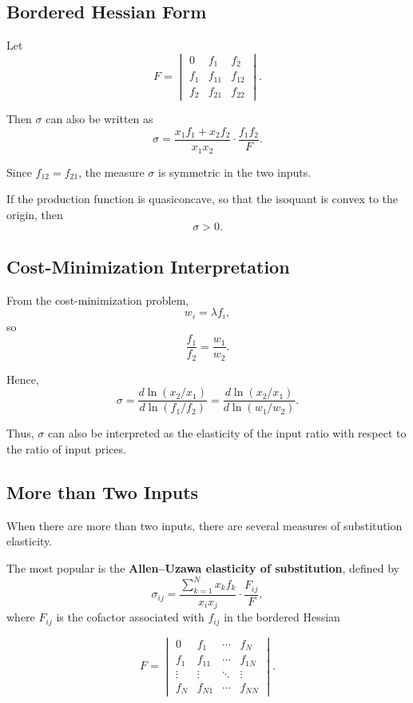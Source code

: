 \subsection*{Bordered Hessian Form}

Let
\[
F =
\begin{vmatrix}
0 & f_1 & f_2 \\
f_1 & f_{11} & f_{12} \\
f_2 & f_{21} & f_{22}
\end{vmatrix}.
\]

Then $\sigma$ can also be written as
\[
\sigma
=
\frac{x_1 f_1 + x_2 f_2}{x_1 x_2}\cdot \frac{f_1 f_2}{F}.
\]

Since $f_{12}=f_{21}$, the measure $\sigma$ is symmetric in the two inputs.

If the production function is quasiconcave, so that the isoquant is convex
to the origin, then
\[
\sigma > 0.
\]

\subsection*{Cost-Minimization Interpretation}

From the cost-minimization problem,
\[
w_i = \lambda f_i,
\]
so
\[
\frac{f_1}{f_2} = \frac{w_1}{w_2}.
\]

Hence,
\[
\sigma
=
\frac{d\ln(x_2/x_1)}{d\ln(f_1/f_2)}
=
\frac{d\ln(x_2/x_1)}{d\ln(w_1/w_2)}.
\]

Thus, $\sigma$ can also be interpreted as the elasticity of the input ratio
with respect to the ratio of input prices.

\subsection*{More than Two Inputs}

When there are more than two inputs, there are several measures of
substitution elasticity.

The most popular is the \textbf{Allen--Uzawa elasticity of substitution},
defined by
\[
\sigma_{ij}
=
\frac{\sum_{k=1}^N x_k f_k}{x_i x_j}\cdot \frac{F_{ij}}{F},
\]
where $F_{ij}$ is the cofactor associated with $f_{ij}$ in the bordered Hessian

\[
F =
\begin{vmatrix}
0 & f_1 & \cdots & f_N \\
f_1 & f_{11} & \cdots & f_{1N} \\
\vdots & \vdots & \ddots & \vdots \\
f_N & f_{N1} & \cdots & f_{NN}
\end{vmatrix}.
\]

